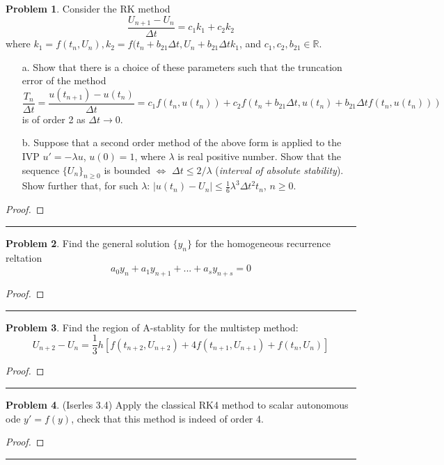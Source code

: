 \documentclass[a4paper, 10pt]{article}
\theoremstyle{definition}
\newtheorem{problem}{Problem}
\theoremstyle{hSol}
\begin{document}
\begin{problem} Consider the RK method
$$
\frac{U_{n+1}-U_n}{\Delta t} = c_1k_1 + c_2 k_2
$$
where $k_1= f(t_n, U_n), k_2 = f(t_n+b_{21}\Delta t, U_n + b_{21}\Delta t k_1$, and $c_1, c_2, b_{21} \in \mathbb{R}$. 
\begin{itemize}
  \item[a.] Show that there is a choice of these parameters such that the truncation error of the method
  $$
  \frac{T_n}{\Delta t} = \frac{u(t_{n+1})-u(t_n)}{\Delta t} = c_1f(t_n, u(t_n)) + c_2 f(t_n+b_{21}\Delta t, u(t_n) + b_{21}\Delta t f(t_n, u(t_n)))
  $$
  is of order 2 as $\Delta t \to 0$.
  \item[b.] Suppose that a second order method of the above form is applied to the IVP $u'=-\lambda u$, $u(0)=1$, where $\lambda$ is real positive number. Show that the sequence $\{U_n\}_{n\geq 0}$ is bounded $\iff$ $\Delta t \leq 2/\lambda$ (\emph{interval of absolute stability}). Show further that, for such $\lambda$: $|u(t_n) - U_n|\leq \frac{1}{6}\lambda^3 \Delta t^2 t_n$, $n\geq 0$.
\end{itemize}
\end{problem}
\begin{proof} 
\end{proof} 
\noindent\rule{16cm}{0.4pt}

\begin{problem} Find the general solution $\{y_n\}$ for the homogeneous recurrence reltation
$$
a_0 y_n + a_1 y_{n+1} + ... + a_s y_{n+s} = 0
$$
\end{problem}
\begin{proof} 
\end{proof} 
\noindent\rule{16cm}{0.4pt}

\begin{problem} Find the region of A-stablity for the multistep method:
$$
U_{n+2} - U_n = \frac{1}{3}h [f(t_{n+2}, U_{n+2}) + 4f(t_{n+1}, U_{n+1}) + f(t_n, U_n) ]
$$
\end{problem}
\begin{proof} 
\end{proof} 
\noindent\rule{16cm}{0.4pt}

\begin{problem} (Iserles 3.4) Apply the classical RK4 method to scalar autonomous ode $y'=f(y)$, check that this method is indeed of order 4.
\end{problem}
\begin{proof} 
\end{proof} 
\noindent\rule{16cm}{0.4pt}
\end{document}
